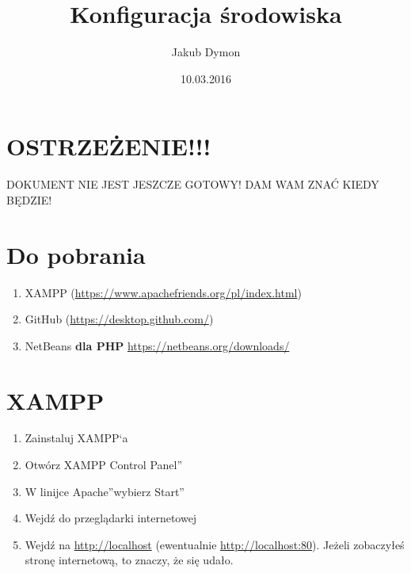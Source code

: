 \documentclass[a4paper, 11pt]{article}
\title{Konfiguracja środowiska}
\author{Jakub Dymon}
\date{10.03.2016}
\begin{document}
	\maketitle
	\section{OSTRZEŻENIE!!!}
	\begin{Large}
		DOKUMENT NIE JEST JESZCZE GOTOWY! DAM WAM ZNAĆ KIEDY BĘDZIE!
	\end{Large}
	\section{Do pobrania}
	\begin{enumerate}
		\item XAMPP (\url{https://www.apachefriends.org/pl/index.html})
		\item GitHub (\url{https://desktop.github.com/})
		\item NetBeans \textbf{dla PHP} {\url{https://netbeans.org/downloads/}}
	\end{enumerate}
	\section{XAMPP}
	\begin{enumerate}
		\item Zainstaluj XAMPP`a
		\item Otwórz \quotedblbase XAMPP Control Panel\textquotedblright
		\item W linijce \quotedblbase Apache\textquotedblright wybierz \quotedblbase Start\textquotedblright
		\item Wejdź do przeglądarki internetowej
		\item Wejdź na \url{http://localhost} (ewentualnie \url{http://localhost:80}). Jeżeli zobaczyłeś stronę internetową, to znaczy, że się udało.
	\end{enumerate}
\end{document}
